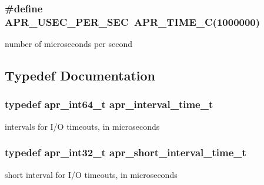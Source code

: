 \subsubsection[{\texorpdfstring{A\+P\+R\+\_\+\+U\+S\+E\+C\+\_\+\+P\+E\+R\+\_\+\+S\+EC}{APR_USEC_PER_SEC}}]{\setlength{\rightskip}{0pt plus 5cm}\#define A\+P\+R\+\_\+\+U\+S\+E\+C\+\_\+\+P\+E\+R\+\_\+\+S\+EC~{\bf A\+P\+R\+\_\+\+T\+I\+M\+E\+\_\+C}(1000000)}\hypertarget{group__apr__time_gab4dd3f3015d25a50f3be3e0e91043abf}{}\label{group__apr__time_gab4dd3f3015d25a50f3be3e0e91043abf}
number of microseconds per second 

\subsection{Typedef Documentation}
\subsubsection[{\texorpdfstring{apr\+\_\+interval\+\_\+time\+\_\+t}{apr_interval_time_t}}]{\setlength{\rightskip}{0pt plus 5cm}typedef apr\+\_\+int64\+\_\+t {\bf apr\+\_\+interval\+\_\+time\+\_\+t}}\hypertarget{group__apr__time_gaae2129185a395cc393f76fabf4f43e47}{}\label{group__apr__time_gaae2129185a395cc393f76fabf4f43e47}
intervals for I/O timeouts, in microseconds 
\subsubsection[{\texorpdfstring{apr\+\_\+short\+\_\+interval\+\_\+time\+\_\+t}{apr_short_interval_time_t}}]{\setlength{\rightskip}{0pt plus 5cm}typedef apr\+\_\+int32\+\_\+t {\bf apr\+\_\+short\+\_\+interval\+\_\+time\+\_\+t}}\hypertarget{group__apr__time_ga3e4663cc0d8b730902ff697c8d3f64be}{}\label{group__apr__time_ga3e4663cc0d8b730902ff697c8d3f64be}
short interval for I/O timeouts, in microseconds 
